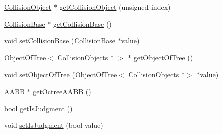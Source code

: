 \begin{DoxyCompactItemize}
\item 
\mbox{\hyperlink{class_collision_object}{Collision\+Object}} $\ast$ \mbox{\hyperlink{class_collision_objects_a4f5c029b20a7ed4c7fdee815f73d20be}{get\+Collision\+Object}} (unsigned index)
\item 
\mbox{\hyperlink{class_collision_base}{Collision\+Base}} $\ast$ \mbox{\hyperlink{class_collision_objects_af95769194fff92babcf411c2262c9d10}{get\+Collision\+Base}} ()
\item 
void \mbox{\hyperlink{class_collision_objects_a144f0c9160c0dda1579c26a0726fdbb6}{set\+Collision\+Base}} (\mbox{\hyperlink{class_collision_base}{Collision\+Base}} $\ast$value)
\item 
\mbox{\hyperlink{class_object_of_tree}{Object\+Of\+Tree}}$<$ \mbox{\hyperlink{class_collision_objects}{Collision\+Objects}} $\ast$ $>$ $\ast$ \mbox{\hyperlink{class_collision_objects_a344311b0c469e591a112eb1d6b0247cb}{get\+Object\+Of\+Tree}} ()
\item 
void \mbox{\hyperlink{class_collision_objects_a3d5a69741d66dcdebfae5a54a15c4b88}{set\+Object\+Of\+Tree}} (\mbox{\hyperlink{class_object_of_tree}{Object\+Of\+Tree}}$<$ \mbox{\hyperlink{class_collision_objects}{Collision\+Objects}} $\ast$$>$ $\ast$value)
\item 
\mbox{\hyperlink{class_a_a_b_b}{A\+A\+BB}} $\ast$ \mbox{\hyperlink{class_collision_objects_aee138e1c28f7f3dcbdce56181d59b628}{get\+Octree\+A\+A\+BB}} ()
\item 
bool \mbox{\hyperlink{class_collision_objects_a1320a57aae5798c04e65b2b7c8433aae}{get\+Is\+Judgment}} ()
\item 
void \mbox{\hyperlink{class_collision_objects_a61e67c1c0ea20a01d9e4a5b2d1b45428}{set\+Is\+Judgment}} (bool value)
\end{DoxyCompactItemize}
